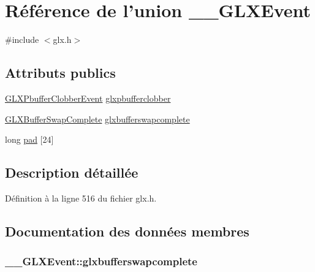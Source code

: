 \hypertarget{union_____g_l_x_event}{\section{Référence de l'union \-\_\-\-\_\-\-G\-L\-X\-Event}
\label{union_____g_l_x_event}
}


{\ttfamily \#include $<$glx.\-h$>$}

\subsection*{Attributs publics}
\begin{DoxyCompactItemize}
\item 
\hyperlink{struct_g_l_x_pbuffer_clobber_event}{G\-L\-X\-Pbuffer\-Clobber\-Event} \hyperlink{union_____g_l_x_event_ada5880e2b424bcb2f60a411aaf713fae}{glxpbufferclobber}
\item 
\hyperlink{struct_g_l_x_buffer_swap_complete}{G\-L\-X\-Buffer\-Swap\-Complete} \hyperlink{union_____g_l_x_event_a6aea59c83ea2c10f86fdfb1573922606}{glxbufferswapcomplete}
\item 
long \hyperlink{union_____g_l_x_event_a1cb8f6e7e77a34d25baf43b3f3bc2d4f}{pad} \mbox{[}24\mbox{]}
\end{DoxyCompactItemize}


\subsection{Description détaillée}


Définition à la ligne 516 du fichier glx.\-h.



\subsection{Documentation des données membres}
\hypertarget{union_____g_l_x_event_a6aea59c83ea2c10f86fdfb1573922606}{
\subsubsection[{glxbufferswapcomplete}]{ \-\_\-\-\_\-\-G\-L\-X\-Event\-::glxbufferswapcomplete}}\label{union_____g_l_x_event_a6aea59c83ea2c10f86fdfb1573922606}


